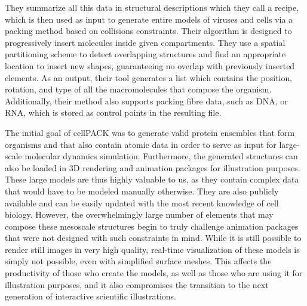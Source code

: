 They summarize all this data in structural descriptions which they call a recipe, which is then used as input to generate entire models of viruses and cells via a packing method based on collisions constraints.
Their algorithm is designed to progressively insert molecules inside given compartments.
They use a spatial partitioning scheme to detect overlapping structures and find an appropriate location to insert new shapes, guaranteeing no overlap with previously inserted elements.
As an output, their tool generates a list which contains the position, rotation, and type of all the macromolecules that compose the organism.
Additionally, their method also supports packing fibre data, such as DNA, or RNA, which is stored as control points in the resulting file.

The initial goal of cellPACK was to generate valid protein ensembles that form organisms and that also contain atomic data in order to serve as input for large-scale molecular dynamics simulation.
Furthermore, the generated structures can also be loaded in 3D rendering and animation packages for illustration purposes.
These large models are thus highly valuable to us, as they contain complex data that would have to be modeled manually otherwise.
They are also publicly available and can be easily updated with the most recent knowledge of cell biology.
However, the overwhelmingly large number of elements that may compose these mesoscale structures begin to truly challenge animation packages that were not designed with such constraints in mind.
While it is still possible to render still images in very high quality, real-time visualization of these models is simply not possible, even with simplified surface meshes. 
This affects the productivity of those who create the models, as well as those who are using it for illustration purposes, and it also compromises the transition to the next generation of interactive scientific illustrations.


